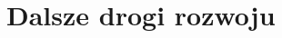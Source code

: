 \documentclass[../FM_mgr.tex]{subfiles}
\begin{document}
\chapter{Dalsze drogi rozwoju}
\end{document}
